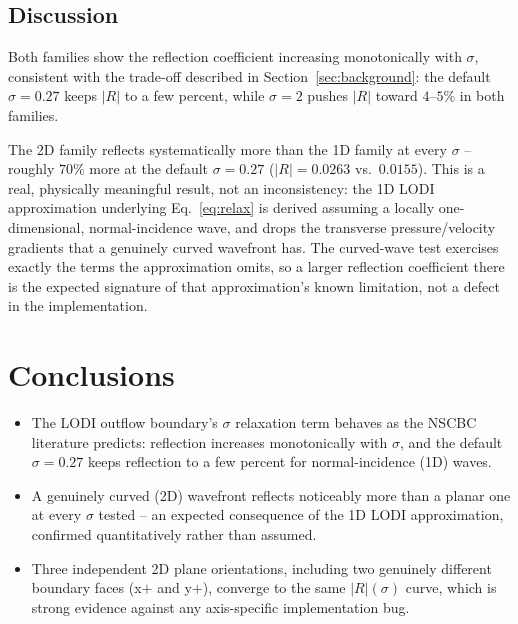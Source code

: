 \documentclass[11pt]{article}
\begin{document}
\subsection{Discussion}

Both families show the reflection coefficient increasing monotonically with
$\sigma$, consistent with the trade-off described in
Section~\ref{sec:background}: the default $\sigma=0.27$ keeps $|R|$ to a few
percent, while $\sigma=2$ pushes $|R|$ toward $4$--$5\%$ in both families.

The 2D family reflects systematically more than the 1D family at every
$\sigma$ -- roughly $70\%$ more at the default $\sigma=0.27$
($|R|=0.0263$ vs.\ $0.0155$). This is a real, physically meaningful result,
not an inconsistency: the 1D LODI approximation underlying
Eq.~\eqref{eq:relax} is derived assuming a locally one-dimensional,
normal-incidence wave, and drops the transverse pressure/velocity gradients
that a genuinely curved wavefront has. The curved-wave test exercises
exactly the terms the approximation omits, so a larger reflection
coefficient there is the expected signature of that approximation's known
limitation, not a defect in the implementation.

\section{Conclusions}

\begin{itemize}
\item The LODI outflow boundary's $\sigma$ relaxation term behaves as the
      NSCBC literature predicts: reflection increases monotonically with
      $\sigma$, and the default $\sigma=0.27$ keeps reflection to a few
      percent for normal-incidence (1D) waves.
\item A genuinely curved (2D) wavefront reflects noticeably more than a
      planar one at every $\sigma$ tested -- an expected consequence of the
      1D LODI approximation, confirmed quantitatively rather than assumed.
\item Three independent 2D plane orientations, including two genuinely
      different boundary faces (x$+$ and y$+$), converge to the same
      $|R|(\sigma)$ curve, which is strong evidence against any
      axis-specific implementation bug.
\end{itemize}
\end{document}
